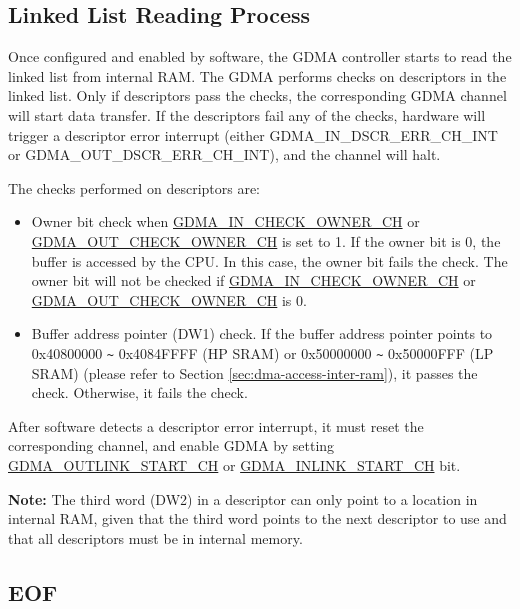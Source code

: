 \documentclass[main\_\_EN.tex]{subfiles}
\begin{document}
\subsection{Linked List Reading Process}

Once configured and enabled by software, the GDMA controller starts to read the linked list from internal RAM. The GDMA performs checks on descriptors in the linked list. Only if descriptors pass the checks, the corresponding GDMA channel will start data transfer. If the descriptors fail any of the checks, hardware will trigger a descriptor error interrupt (either GDMA\_IN\_DSCR\_ERR\_CH\_INT or GDMA\_OUT\_DSCR\_ERR\_CH\_INT), and the channel will halt.

The checks performed on descriptors are:
\begin{itemize}
    \item Owner bit check when \hyperref[fielddesc:GDMAINCHECKOWNERCHN]{GDMA\_IN\_CHECK\_OWNER\_CH} or \hyperref[fielddesc:GDMAOUTCHECKOWNERCHN]{GDMA\_OUT\_CHECK\_OWNER\_CH} is set to 1. If the owner bit is 0, the buffer is accessed by the CPU. In this case, the owner bit fails the check. The owner bit will not be checked if \hyperref[fielddesc:GDMAINCHECKOWNERCHN]{GDMA\_IN\_CHECK\_OWNER\_CH} or \hyperref[fielddesc:GDMAOUTCHECKOWNERCHN]{GDMA\_OUT\_CHECK\_OWNER\_CH} is 0.
    \item Buffer address pointer (DW1) check. If the buffer address pointer points to 0x40800000 \verb+~+ 0x4084FFFF (HP SRAM) or 0x50000000 \verb+~+ 0x50000FFF (LP SRAM) (please refer to Section \ref{sec:dma-access-inter-ram}), it passes the check. Otherwise, it fails the check.
\end{itemize}

After software detects a descriptor error interrupt, it must reset the corresponding channel, and enable GDMA by setting \hyperref[fielddesc:GDMAOUTLINKSTARTCHN]{GDMA\_OUTLINK\_START\_CH} or \hyperref[fielddesc:GDMAINLINKSTARTCHN]{GDMA\_INLINK\_START\_CH} bit.

{\bfseries Note:} The third word (DW2) in a descriptor can only point to a location in internal RAM, given that the third word points to the next descriptor to use and that all descriptors must be in internal memory.

\subsection{EOF}
\end{document}
